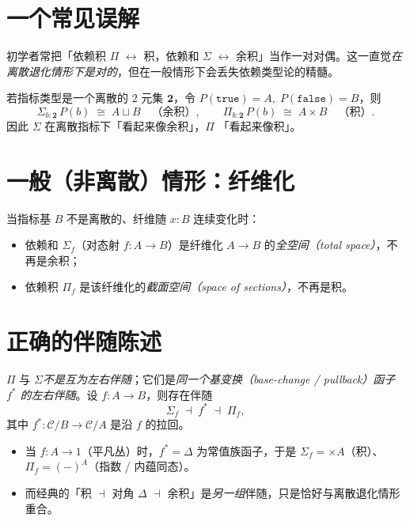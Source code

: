 \documentclass[10pt, openany]{book}
\begin{document}
\section{一个常见误解}

初学者常把「依赖积 $\Pi$ $\leftrightarrow$ 积，依赖和 $\Sigma$ $\leftrightarrow$ 余积」当作一对对偶。这一直觉\emph{在离散退化情形下是对的}，但在一般情形下会丢失依赖类型论的精髓。

\begin{definition}[离散指标退化情形]
  若指标类型是一个离散的 $2$ 元集 $\mathbf{2}$，令 $P(\mathtt{true})=A,\; P(\mathtt{false})=B$，则
  \[
    \Sigma_{b:\mathbf{2}}\, P(b) \;\cong\; A \sqcup B \quad\text{（余积）},\qquad
    \Pi_{b:\mathbf{2}}\, P(b) \;\cong\; A \times B \quad\text{（积）}.
  \]
  因此 $\Sigma$ 在离散指标下「看起来像余积」，$\Pi$ 「看起来像积」。
\end{definition}

\section{一般（非离散）情形：纤维化}

当指标基 $B$ 不是离散的、纤维随 $x:B$ 连续变化时：
\begin{itemize}
  \item 依赖和 $\Sigma_f$（对态射 $f:A\to B$）是纤维化 $A\to B$ 的\emph{全空间（total space）}，不再是余积；
  \item 依赖积 $\Pi_f$ 是该纤维化的\emph{截面空间（space of sections）}，不再是积。
\end{itemize}

\section{正确的伴随陈述}

$\Pi$ 与 $\Sigma$\emph{不是互为左右伴随}；它们是\emph{同一个基变换（base-change / pullback）函子 $f^{*}$ 的左右伴随}。设 $f:A\to B$，则存在伴随
\[
  \Sigma_f \;\dashv\; f^{*} \;\dashv\; \Pi_f ,
\]
其中 $f^{*}:\mathcal{C}/B\to\mathcal{C}/A$ 是沿 $f$ 的拉回。

\begin{itemize}
  \item 当 $f:A\to 1$（平凡丛）时，$f^{*}=\Delta$ 为常值族函子，于是 $\Sigma_f = \times A$（积）、$\Pi_f = (-)^{A}$（指数 / 内蕴同态）。
  \item 而经典的「积 $\dashv$ 对角 $\Delta$ $\dashv$ 余积」是\emph{另一组}伴随，只是恰好与离散退化情形重合。
\end{itemize}
\end{document}
